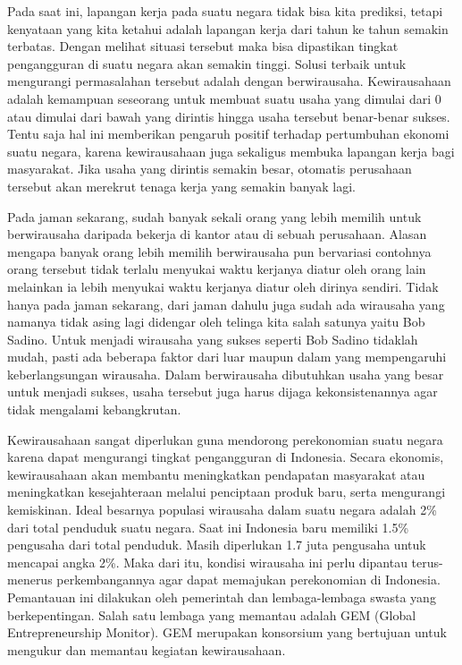 \documentclass[a4paper,twoside]{article}
\begin{document}
Pada saat ini, lapangan kerja pada suatu negara tidak bisa kita prediksi, tetapi kenyataan yang kita ketahui adalah lapangan kerja dari tahun ke tahun semakin terbatas. Dengan melihat situasi tersebut maka bisa dipastikan tingkat pengangguran di suatu negara akan semakin tinggi. Solusi terbaik untuk mengurangi permasalahan tersebut adalah dengan berwirausaha. Kewirausahaan adalah kemampuan seseorang untuk membuat suatu usaha yang dimulai dari 0 atau dimulai dari bawah yang dirintis hingga usaha tersebut benar-benar sukses. Tentu saja hal ini memberikan pengaruh positif terhadap pertumbuhan ekonomi suatu negara, karena kewirausahaan juga sekaligus membuka lapangan kerja bagi masyarakat. Jika usaha yang dirintis semakin besar, otomatis perusahaan tersebut akan merekrut tenaga kerja yang semakin banyak lagi. 

 
Pada jaman sekarang, sudah banyak sekali orang yang lebih memilih untuk berwirausaha daripada bekerja di kantor atau di sebuah perusahaan. Alasan mengapa banyak orang lebih memilih berwirausaha pun bervariasi contohnya orang tersebut tidak terlalu menyukai waktu kerjanya diatur oleh orang lain melainkan ia lebih menyukai waktu kerjanya diatur oleh dirinya sendiri. Tidak hanya pada jaman sekarang, dari jaman dahulu juga sudah ada wirausaha yang namanya tidak asing lagi didengar oleh telinga kita salah satunya yaitu Bob Sadino. Untuk menjadi wirausaha yang sukses seperti Bob Sadino tidaklah mudah, pasti ada beberapa faktor dari luar maupun dalam yang mempengaruhi keberlangsungan wirausaha. Dalam berwirausaha dibutuhkan usaha yang besar untuk menjadi sukses, usaha tersebut juga harus dijaga kekonsistenannya agar tidak mengalami kebangkrutan.


Kewirausahaan sangat diperlukan guna mendorong perekonomian suatu negara karena dapat mengurangi tingkat pengangguran di Indonesia. Secara ekonomis, kewirausahaan akan membantu meningkatkan pendapatan masyarakat atau meningkatkan kesejahteraan melalui penciptaan produk baru, serta mengurangi kemiskinan.  Ideal besarnya populasi wirausaha dalam suatu negara adalah 2\% dari total penduduk suatu negara. Saat ini Indonesia baru memiliki 1.5\% pengusaha dari total penduduk. Masih diperlukan 1.7 juta pengusaha untuk mencapai angka 2\%. Maka dari itu, kondisi wirausaha ini perlu dipantau terus-menerus perkembangannya agar dapat memajukan perekonomian di Indonesia. Pemantauan ini dilakukan oleh pemerintah dan lembaga-lembaga swasta yang berkepentingan. Salah satu lembaga yang memantau adalah GEM (Global Entrepreneurship Monitor). GEM merupakan konsorsium yang bertujuan untuk mengukur dan memantau kegiatan kewirausahaan. 
\end{document}

